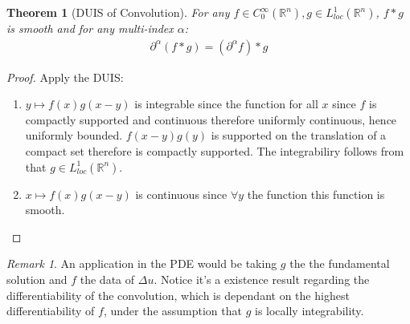 \documentclass[a4paper,11pt,fleqn]{book}
\newtheorem{theorem}{Theorem}[section]
\theoremstyle{definition}
\theoremstyle{remark}
\newtheorem*{remark}{Remark}
\begin{document}
\begin{theorem}[DUIS of Convolution]
	For any $f \in C_0^\infty(\mathbb{R}^n), g \in L^1_{loc}(\mathbb{R}^n)$, $f*g$ is smooth and for any multi-index $\alpha$:
	\begin{align*}
		\partial^\alpha(f*g) = (\partial^\alpha f) * g
	\end{align*}
\end{theorem}
\begin{proof}
	Apply the DUIS:
	\begin{enumerate}
		\item $y \mapsto f(x)g(x-y)$ is integrable since the function for all $x$ since $f$ is compactly supported and continuous therefore uniformly continuous, hence uniformly bounded. $f(x - y)g(y)$ is supported on the translation of a compact set therefore is compactly supported. The integrabiliry follows from that $g \in L_{loc}^1(\mathbb{R}^n)$. 
		\item $x \mapsto f(x)g(x-y)$ is continuous since $\forall y$ the function this function is smooth. 
	\end{enumerate}
\end{proof}
\begin{remark}
An application in the PDE would be taking $g$ the the fundamental solution and $f$ the data of $\Delta u$.	Notice it's a existence result regarding the differentiability of the convolution, which is dependant on the highest differentiability of $f$, under the assumption that $g$ is locally integrability.
\end{remark}
	
\end{document}
